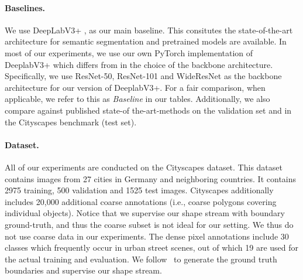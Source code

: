 \documentclass[10pt,twocolumn,letterpaper]{article}
\begin{document}
 \vspace{-3mm}
\paragraph{Baselines.}
We use DeepLabV3+ \cite{deeplabv3plus2018}, as our main baseline. This 
consitutes the state-of-the-art architecture for semantic segmentation
and
pretrained models are available.
In most of our experiments, we use our own PyTorch implementation of DeeplabV3+ which differs from \cite{deeplabv3plus2018} in the choice of the backbone architecture. 
Specifically, we use ResNet-50, ResNet-101 and WideResNet as the backbone architecture for our version of DeeplabV3+.
For a fair comparison, when applicable, we refer to this as \emph{Baseline} in our tables.
Additionally,  we also compare against 
published state-of the-art-methods on the validation set and in the Cityscapes benchmark (test set). 
\vspace{-3mm}
\paragraph{Dataset.} 
All of our experiments are conducted on the Cityscapes dataset.
This dataset contains images 
from 27 cities in Germany and neighboring countries. It
contains 2975 training, 500 validation and 1525 test images. 
Cityscapes additionally includes 20,000 additional coarse annotations
(i.e., coarse polygons covering individual objects).
Notice that we supervise our shape stream with boundary ground-truth, and thus the coarse subset is not ideal for our setting. We thus do not use coarse data in our experiments. 
The dense pixel annotations include 30 classes which frequently occur in urban street scenes, out of which 19 are used for the actual training and evaluation. 
We follow~\cite{yu2017casenet,yu2018seal,david19edges} to generate the ground truth
boundaries and supervise our shape stream. 



\vspace{-4mm}
\end{document}
